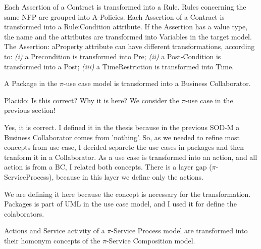 Each {\sf Assertion} of a {\sf Contract} is transformed into a {\sf Rule}. 
{\sf Rules}  concerning the same NFP  are grouped into {\sf A-Policies}. 
Each {\sf Assertion} of a {\sf Contract} is transformed into a {\sf Rule:Condition} attribute. 
If the {\sf Assertion} has a value type, the name and the attributes are transformed into {\sf Variables} in the target model.  
The {\sf Assertion: aProperty} attribute can have different transformations, according to: 
\textit{(i)} a {\sf Precondition} is transformed into {\sf Pre};
\textit{(ii)} a {\sf Post-Condition} is transformed into a {\sf  Post};
\textit{(iii)} a {\sf TimeRestriction} is transformed into {\sf Time}.

%
{\color{red}
A {\sf Package} in the $\pi$-use case model is transformed   into a {\sf Business Collaborator}. 

Placido: Is this correct? Why it is here? We consider the $\pi$-use case in the previous section!
}{\color{blue} Yes, it is correct. I defined it in the thesis because in the
previous SOD-M a Business Collaborator comes from 'nothing'. So, as we needed to
refine most concepts from use case, I decided separete the use cases in
packages and then tranform it in a Collaborator. As a use case is transformed
into an action, and all action is from a BC, I related both concepts. There is a
layer gap ($\pi$-ServiceProcess), because in this layer we define only the
actions.  

We are defining it here because the concept is necessary for the
transformation. Packages is part of UML in the use case model, and I used it for define the colaborators.}

{\sf Actions} and {\sf Service activity} of a $\pi$-Service Process model are transformed into their homonym concepts of the $\pi$-Service Composition model. 


